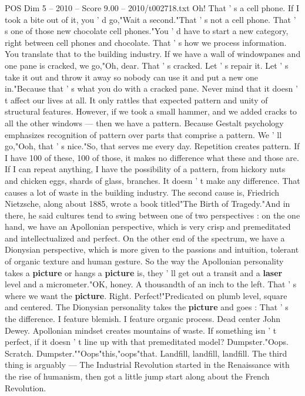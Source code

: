 \begin{textsample}{POS Dim 5 – 2010 – Score 9.00 – 2010/t002718.txt}
Oh!
That ' s a cell phone.
If I took a bite out of it, you ' d go,"Wait a second."That ' s not a cell phone.
That ' s one of those new chocolate cell phones."You ' d have to start a new category, right between cell phones and chocolate.
That ' s how we process information.
You translate that to the building industry.
If we have a wall of windowpanes and one pane is cracked, we go,"Oh, dear.
That ' s cracked.
Let ' s repair it.
Let ' s take it out and throw it away so nobody can use it and put a new one in."Because that ' s what you do with a cracked pane.
Never mind that it doesn ' t affect our lives at all.
It only rattles that expected pattern and unity of structural features.
However, if we took a small hammer, and we added cracks to all the other windows — then we have a pattern.
Because Gestalt psychology emphasizes recognition of pattern over parts that comprise a pattern.
We ' ll go,"Ooh, that ' s nice."So, that serves me every day.
Repetition creates pattern.
If I have 100 of these, 100 of those, it makes no difference what these and those are.
If I can repeat anything, I have the possibility of a pattern, from hickory nuts and chicken eggs, shards of glass, branches.
It doesn ' t make any difference.
That causes a lot of waste in the building industry.
The second cause is, Friedrich Nietzsche, along about 1885, wrote a book titled"The Birth of Tragedy."And in there, he said cultures tend to swing between one of two perspectives : on the one hand, we have an Apollonian perspective, which is very crisp and premeditated and intellectualized and perfect.
On the other end of the spectrum, we have a Dionysian perspective, which is more given to the passions and intuition, tolerant of organic texture and human gesture.
So the way the Apollonian personality takes a \textbf{picture} or hangs a \textbf{picture} is, they ' ll get out a transit and a \textbf{laser} level and a micrometer."OK, honey.
A thousandth of an inch to the left.
That ' s where we want the \textbf{picture}.
Right.
Perfect!"Predicated on plumb level, square and centered.
The Dionysian personality takes the \textbf{picture} and goes : That ' s the difference.
I feature blemish.
I feature organic process.
Dead center John Dewey.
Apollonian mindset creates mountains of waste.
If something isn ' t perfect, if it doesn ' t line up with that premeditated model?
Dumpster."Oops.
Scratch.
Dumpster.""Oops"this,"oops"that.
Landfill, landfill, landfill.
The third thing is arguably — The Industrial Revolution started in the Renaissance with the rise of humanism, then got a little jump start along about the French Revolution.

\end{textsample}
